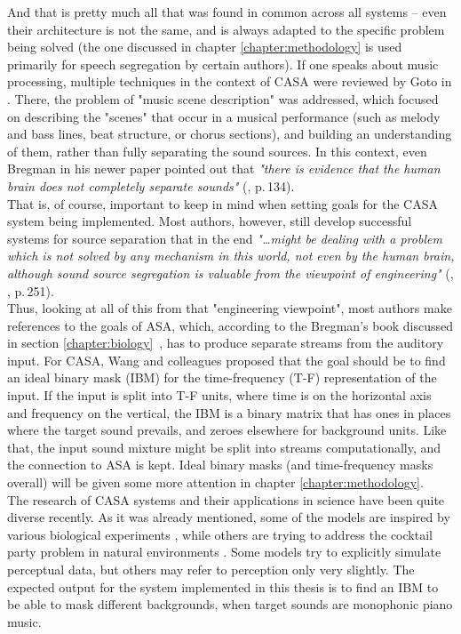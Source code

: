 And that is pretty much all that was found in common across all systems -- even their architecture is not the same, and is always adapted to the specific problem being solved (the one discussed in chapter \ref{chapter:methodology} is used primarily for speech segregation by certain authors). If one speaks about music processing, multiple techniques in the context of CASA were reviewed by Goto in \cite{Wang2006}. There, the problem of "music scene description" was addressed, which focused on describing the "scenes" that occur in a musical performance (such as melody and bass lines, beat structure, or chorus sections), and building an understanding of them, rather than fully separating the sound sources. In this context, even Bregman in his newer paper pointed out that \textit{"there is evidence that the human brain does not completely separate sounds"} (\cite{Bregman1995}, p.\,134).\\

That is, of course, important to keep in mind when setting goals for the CASA system being implemented. Most authors, however, still develop successful systems for source separation that in the end \textit{"\dots{}might be dealing with a problem which is not solved by any mechanism in this world, not even by the human brain, although sound source segregation is valuable from the viewpoint of engineering"} (\cite{Goto2004}, \cite{Wang2006}, p.\,251).\\

Thus, looking at all of this from that "engineering viewpoint", most authors make references to the goals of ASA, which, according to the Bregman's book discussed in section \ref{chapter:biology}~\cite{Bregman1990}, has to produce separate streams from the auditory input. For CASA, Wang and colleagues \cite{Wang2005} proposed that the goal should be to find an ideal binary mask (IBM) for the time-frequency (T-F) representation of the input. If the input is split into T-F units, where time is on the horizontal axis and frequency on the vertical, the IBM is a binary matrix that has ones in places where the target sound prevails, and zeroes elsewhere for background units. Like that, the input sound mixture might be split into streams computationally, and the connection to ASA is kept. Ideal binary masks (and time-frequency masks overall) will be given some more attention in chapter \ref{chapter:methodology}.\\

The research of CASA systems and their applications in science \cite{Szabo2016} have been quite diverse recently. As it was already mentioned, some of the models are inspired by various biological experiments \cite{Wang2008}\cite{Boes2011}, while others are trying to address the cocktail party problem in natural environments \cite{Elhilali2008}. Some models try to explicitly simulate perceptual data, but others may refer to perception only very slightly. The expected output for the system implemented in this thesis is to find an IBM to be able to mask different backgrounds, when target sounds are monophonic piano music.\\

